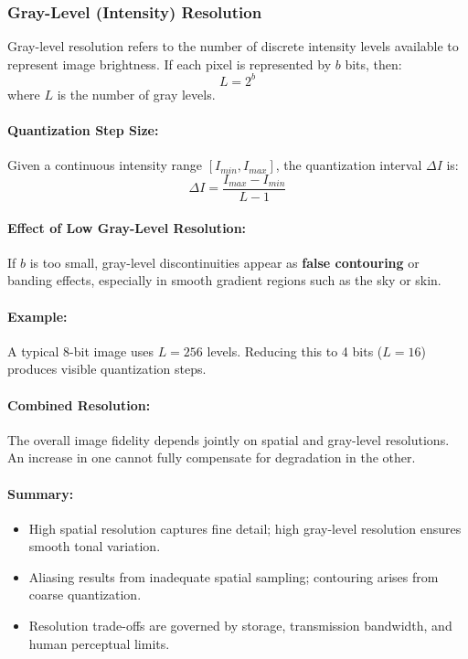 \documentclass[12pt,a4paper]{AnantDocumentation}
\begin{document}
\subsubsection{Gray-Level (Intensity) Resolution}
Gray-level resolution refers to the number of discrete intensity levels available to represent image brightness. If each pixel is represented by $b$ bits, then:
\begin{equation}
L = 2^b
\end{equation}
where $L$ is the number of gray levels.

\paragraph{Quantization Step Size:}
Given a continuous intensity range $[I_{min}, I_{max}]$, the quantization interval $\Delta I$ is:
\begin{equation}
\Delta I = \frac{I_{max} - I_{min}}{L - 1}
\end{equation}

\paragraph{Effect of Low Gray-Level Resolution:}
If $b$ is too small, gray-level discontinuities appear as \textbf{false contouring} or banding effects, especially in smooth gradient regions such as the sky or skin.

\paragraph{Example:}
A typical 8-bit image uses $L=256$ levels. Reducing this to 4 bits ($L=16$) produces visible quantization steps.

\paragraph{Combined Resolution:}
The overall image fidelity depends jointly on spatial and gray-level resolutions. An increase in one cannot fully compensate for degradation in the other.

\paragraph{Summary:}
\begin{itemize}
\item High spatial resolution captures fine detail; high gray-level resolution ensures smooth tonal variation.
\item Aliasing results from inadequate spatial sampling; contouring arises from coarse quantization.
\item Resolution trade-offs are governed by storage, transmission bandwidth, and human perceptual limits.
\end{itemize}
\end{document}
